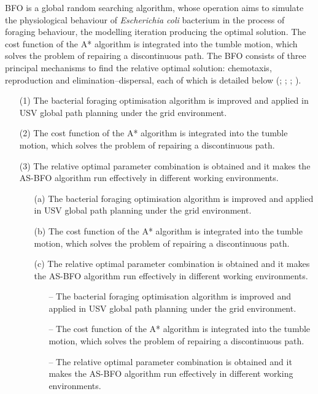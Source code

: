 \documentclass{PDS}%
\theoremstyle{definition}
\begin{document}
BFO is a global random searching algorithm, whose operation aims to simulate the
physiological behaviour of \textit{Escherichia coli} bacterium in the process of foraging behaviour, the
modelling iteration producing the optimal solution. The cost function of the A* algorithm is integrated into the tumble motion, which
solves the problem of repairing a discontinuous path. The BFO consists of three principal
mechanisms to find the relative optimal solution: chemotaxis, reproduction and
elimination--dispersal, each of which is detailed below (\citealp{r21}; \citealp{r36};
\citealp{r37}; \citealp{r35}).
\begin{enumerate}[(3)]
\item[(1)] The bacterial foraging optimisation algorithm is improved and applied in USV
global path planning under the grid environment.

\item[(2)] The cost function of the A* algorithm is integrated into the tumble motion, which
solves the problem of repairing a discontinuous path.

\item[(3)] The relative optimal parameter combination is obtained and it makes the AS-BFO algorithm
run effectively in different working environments.
\begin{enumerate}[(a)]
\item[(a)] The bacterial foraging optimisation algorithm is improved and applied in USV
global path planning under the grid environment.

\item[(b)] The cost function of the A* algorithm is integrated into the tumble motion, which
solves the problem of repairing a discontinuous path.

\item[(c)] The relative optimal parameter combination is obtained and it makes the AS-BFO algorithm
run effectively in different working environments.

\begin{enumerate}[--]
\item[--] The bacterial foraging optimisation algorithm is improved and applied in USV
global path planning under the grid environment.

\item[--] The cost function of the A* algorithm is integrated into the tumble motion, which
solves the problem of repairing a discontinuous path.

\item[--] The relative optimal parameter combination is obtained and it makes the AS-BFO algorithm
run effectively in different working environments.
\end{enumerate}

\end{enumerate}
\end{enumerate}
\end{document}

